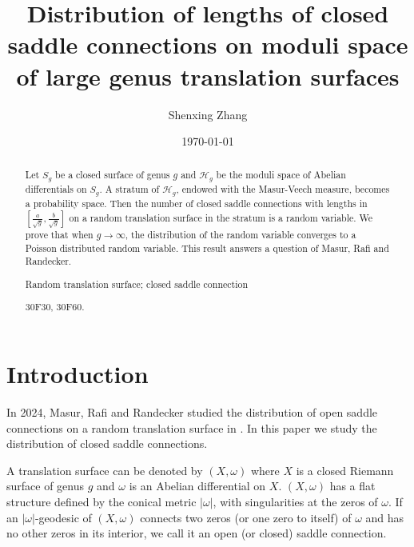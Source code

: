 \documentclass[12pt]{amsart} %
\theoremstyle{definition}
\theoremstyle{remark}
\numberwithin{equation}{section}
\renewcommand\H{{\mathcal H}}
\begin{document}
\title[Distribution of lengths of closed saddle connections]{Distribution of lengths of closed saddle connections on moduli space of large genus translation surfaces }

\author{Shenxing Zhang}

\address{Shenxing Zhang: School of Mathematics and Statistics, Nanjing University of Science and Technology, Nanjing, 210094, China} 

\date{\today}


\maketitle



\noindent

\begin{abstract}
Let $S_g$ be a closed surface of genus $g$ and $\H_g$ be the moduli space of Abelian differentials on $S_g$.
A stratum of $\H_g$, endowed with the Masur-Veech measure, becomes a probability space. 
Then the number of closed saddle connections with lengths in $[\frac{a}{\sqrt{g}},\frac{b}{\sqrt{g}}]$ on a random translation
surface in the stratum is a random variable.
We prove that when $g\to \infty$, the distribution of the random variable converges to a Poisson distributed random variable. 
This result answers a question of Masur, Rafi and Randecker.

\medskip

 Random translation surface; closed saddle connection

\medskip

 {30F30, 30F60.}
\end{abstract}



\maketitle

\section{Introduction}
In 2024, Masur, Rafi and Randecker studied the distribution of open saddle connections on a random translation surface in \cite{masur2024lengths}. 
In this paper we study the distribution of closed saddle connections.


A translation surface can be denoted by $(X,\omega)$ where $X$ is a closed Riemann surface of genus $g$ and $\omega$ is an Abelian differential on $X$.
$(X,\omega)$ has a flat structure defined by the conical metric $|\omega|$, with singularities at the zeros of $\omega$.
If an $|\omega|$-geodesic of $(X,\omega)$ connects two zeros (or one zero to itself) of $\omega$ and has no other zeros in its interior,
we call it an open (or closed) saddle connection.
\end{document}
